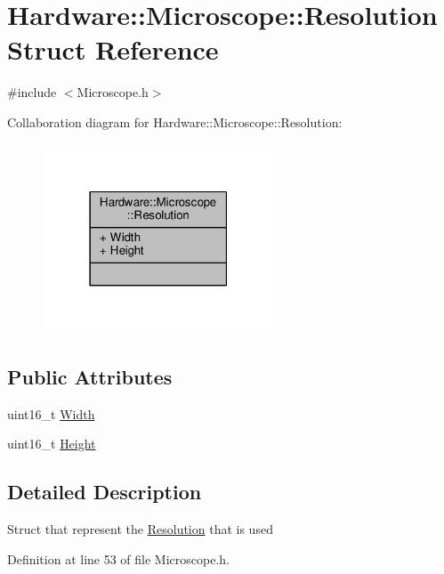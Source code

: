 \hypertarget{struct_hardware_1_1_microscope_1_1_resolution}{}\section{Hardware\+:\+:Microscope\+:\+:Resolution Struct Reference}
\label{struct_hardware_1_1_microscope_1_1_resolution}


{\ttfamily \#include $<$Microscope.\+h$>$}



Collaboration diagram for Hardware\+:\+:Microscope\+:\+:Resolution\+:\nopagebreak
\begin{figure}[H]
\begin{center}
\leavevmode
\includegraphics[width=195pt]{struct_hardware_1_1_microscope_1_1_resolution__coll__graph}
\end{center}
\end{figure}
\subsection*{Public Attributes}
\begin{DoxyCompactItemize}
\item 
uint16\+\_\+t \hyperlink{struct_hardware_1_1_microscope_1_1_resolution_a0e1ef543db0224230559cd9c6531aad2}{Width}
\item 
uint16\+\_\+t \hyperlink{struct_hardware_1_1_microscope_1_1_resolution_aaa54a929acd6e8c224182a97264c85d1}{Height}
\end{DoxyCompactItemize}


\subsection{Detailed Description}
Struct that represent the \hyperlink{struct_hardware_1_1_microscope_1_1_resolution}{Resolution} that is used 

Definition at line 53 of file Microscope.\+h.



